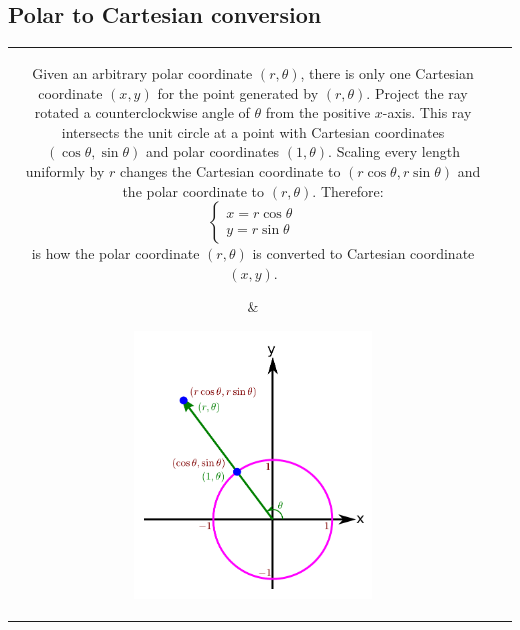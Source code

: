 \documentclass{article}
\begin{document}
\subsection*{Polar to Cartesian conversion}

\begin{tabular}{cc}
\parbox{0.5\textwidth}{
Given an arbitrary polar coordinate \((r, \theta)\), there is only one Cartesian coordinate \((x, y)\) for the point generated by \((r, \theta)\). Project the ray rotated a counterclockwise angle of \(\theta\) from the positive \(x\)-axis. This ray intersects the unit circle at a point with Cartesian coordinates \((\cos\theta, \sin\theta)\) and polar coordinates \((1, \theta)\). Scaling every length uniformly by \(r\) changes the Cartesian coordinate to \((r\cos\theta, r\sin\theta)\) and the polar coordinate to \((r, \theta)\). Therefore:
\[\left\{\begin{array}{c} x = r\cos\theta \\ y = r\sin\theta \end{array}\right.\]
is how the polar coordinate \((r, \theta)\) is converted to Cartesian coordinate \((x, y)\).
} & \parbox{0.5\textwidth}{
\includegraphics[width = 0.5\textwidth]{polar_to_cartesian_conversion}
}
\end{tabular}
\end{document}
